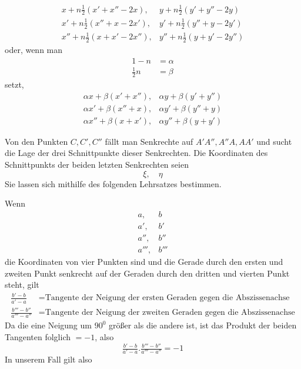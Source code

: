 %
\[
\begin{array}{ll}
x+n\tfrac12(x'+x''-2x),&y+n\tfrac12(y'+y''-2y)\\
x'+n\tfrac12(x''+x-2x'),&y'+n\tfrac12(y''+y-2y')\\
x''+n\tfrac12(x+x'-2x''),&y''+n\tfrac12(y+y'-2y'')
\end{array}
\]
oder, wenn man
\[
\begin{aligned}1-n&=\alpha\\\tfrac12n&=\beta\end{aligned}
\]
setzt,
\[
\begin{array}{ll}
\alpha x+\beta(x'+x''),&\alpha y+\beta(y'+y'')\\
\alpha x'+\beta(x''+x),&\alpha y'+\beta(y''+y)\\
\alpha x''+\beta(x+x'),&\alpha y''+\beta(y+y')
\end{array}
\]
\par
Von den Punkten \(C,C',C''\) fällt man Senkrechte auf \(A'A'',A''A,AA'\) und sucht die Lage der drei Schnittpunkte dieser Senkrechten. Die Koordinaten des Schnittpunkts der beiden letzten Senkrechten seien
\[
\xi,\quad\eta
\]
Sie lassen sich mithilfe des folgenden Lehrsatzes bestimmen.

Wenn
\[
\begin{array}{ll}
a,&b\\a',&b'\\a'',&b''\\a''',&b'''
\end{array}
\]
die Koordinaten von vier Punkten sind und die Gerade durch den ersten und zweiten Punkt senkrecht auf der Geraden durch den dritten und vierten Punkt steht, gilt
\begingroup\small
\[
\begin{aligned}
\tfrac{b'-b}{a'-a}&=\text{Tangente der Neigung der ersten Geraden gegen die Abszissenachse}\\
\tfrac{b'''-b''}{a'''-a''}&=\text{Tangente der Neigung der zweiten Geraden gegen die Abszissenachse}
\end{aligned}
\]
\endgroup
Da die eine Neigung um \(90^0\) größer als die andere ist, ist das Produkt der beiden Tangenten folglich \(=-1\), also
\[
\tfrac{b'-b}{a'-a}.\tfrac{b'''-b''}{a'''-a''}=-1
\]
In unserem Fall gilt also
